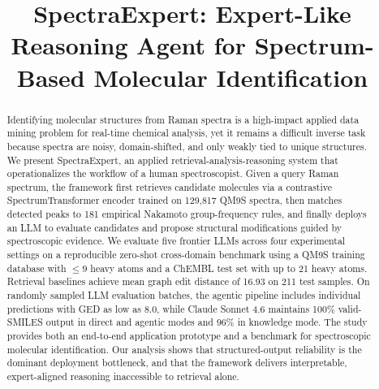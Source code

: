 \documentclass[conference]{IEEEtran}
\begin{document}
\title{SpectraExpert: Expert-Like Reasoning Agent for Spectrum-Based Molecular Identification}
\author{



}


\maketitle


\begin{abstract}
Identifying molecular structures from Raman spectra is a high-impact applied data mining problem for real-time chemical analysis, yet it remains a difficult inverse task because spectra are noisy, domain-shifted, and only weakly tied to unique structures. We present SpectraExpert, an applied retrieval-analysis-reasoning system that operationalizes the workflow of a human spectroscopist. Given a query Raman spectrum, the framework first retrieves candidate molecules via a contrastive SpectrumTransformer encoder trained on 129,817 QM9S spectra, then matches detected peaks to 181 empirical Nakamoto group-frequency rules, and finally deploys an LLM to evaluate candidates and propose structural modifications guided by spectroscopic evidence. We evaluate five frontier LLMs across four experimental settings on a reproducible zero-shot cross-domain benchmark using a QM9S training database with $\leq 9$ heavy atoms and a ChEMBL test set with up to 21 heavy atoms. Retrieval baselines achieve mean graph edit distance of 16.93 on 211 test samples. On randomly sampled LLM evaluation batches, the agentic pipeline includes individual predictions with GED as low as 8.0, while Claude Sonnet 4.6 maintains 100\% valid-SMILES output in direct and agentic modes and 96\% in knowledge mode. The study provides both an end-to-end application prototype and a benchmark for spectroscopic molecular identification. Our analysis shows that structured-output reliability is the dominant deployment bottleneck, and that the framework delivers interpretable, expert-aligned reasoning inaccessible to retrieval alone.
\end{abstract}
\end{document}
